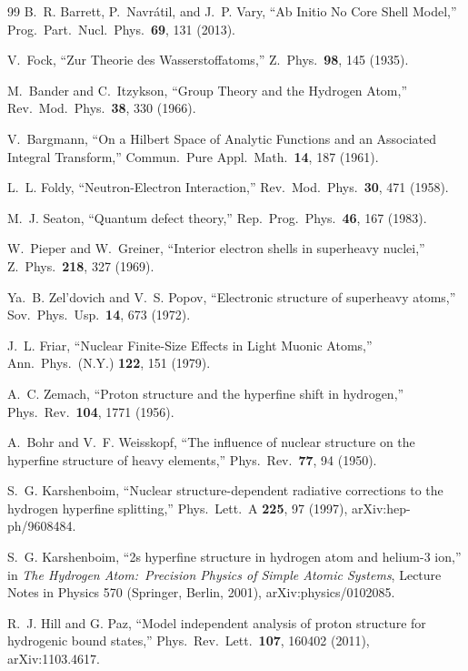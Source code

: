 \documentclass[twocolumn,prc,amsmath,amssymb,superscriptaddress]{revtex4-2}
\begin{document}
\begin{thebibliography}{99}
B.~R. Barrett, P.~Navr\'atil, and J.~P. Vary,
``Ab Initio No Core Shell Model,''
Prog.~Part.~Nucl.~Phys.~\textbf{69}, 131 (2013).

V.~Fock,
``Zur Theorie des Wasserstoffatoms,''
Z.~Phys.~\textbf{98}, 145 (1935).

M.~Bander and C.~Itzykson,
``Group Theory and the Hydrogen Atom,''
Rev.~Mod.~Phys.~\textbf{38}, 330 (1966).

V.~Bargmann,
``On a Hilbert Space of Analytic Functions and an Associated Integral
Transform,''
Commun.~Pure Appl.~Math.~\textbf{14}, 187 (1961).

L.~L. Foldy,
``Neutron-Electron Interaction,''
Rev.~Mod.~Phys.~\textbf{30}, 471 (1958).

M.~J. Seaton,
``Quantum defect theory,''
Rep.~Prog.~Phys.~\textbf{46}, 167 (1983).

W.~Pieper and W.~Greiner,
``Interior electron shells in superheavy nuclei,''
Z.~Phys.~\textbf{218}, 327 (1969).

Ya.~B. Zel'dovich and V.~S. Popov,
``Electronic structure of superheavy atoms,''
Sov.~Phys.~Usp.~\textbf{14}, 673 (1972).

J.~L. Friar,
``Nuclear Finite-Size Effects in Light Muonic Atoms,''
Ann.~Phys.~(N.Y.) \textbf{122}, 151 (1979).

A.~C. Zemach,
``Proton structure and the hyperfine shift in hydrogen,''
Phys.~Rev.~\textbf{104}, 1771 (1956).

A.~Bohr and V.~F. Weisskopf,
``The influence of nuclear structure on the hyperfine structure of heavy elements,''
Phys.~Rev.~\textbf{77}, 94 (1950).

S.~G. Karshenboim,
``Nuclear structure-dependent radiative corrections to the hydrogen hyperfine splitting,''
Phys.~Lett.~A \textbf{225}, 97 (1997), arXiv:hep-ph/9608484.

S.~G. Karshenboim,
``2s hyperfine structure in hydrogen atom and helium-3 ion,''
in \emph{The Hydrogen Atom:\ Precision Physics of Simple Atomic Systems},
Lecture Notes in Physics 570 (Springer, Berlin, 2001), arXiv:physics/0102085.

R.~J. Hill and G. Paz,
``Model independent analysis of proton structure for hydrogenic bound states,''
Phys.~Rev.~Lett.~\textbf{107}, 160402 (2011), arXiv:1103.4617.


\end{thebibliography}
\end{document}
